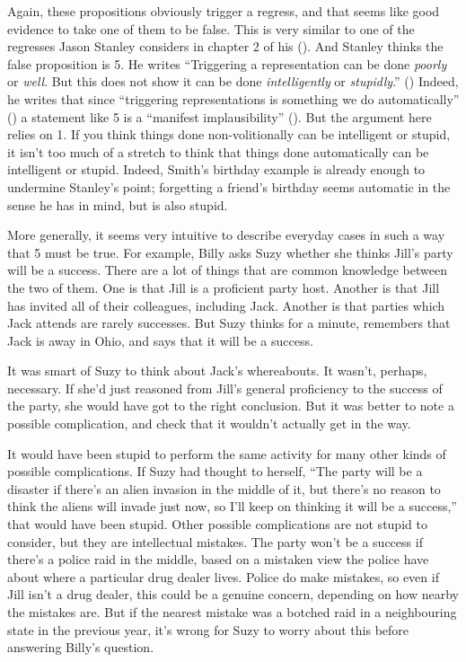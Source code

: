 \documentclass[
  10pt,
  letterpaper,
  DIV=11,
  numbers=noendperiod,
  twoside]{scrartcl}
\begin{document}
Again, these propositions obviously trigger a regress, and that seems
like good evidence to take one of them to be false. This is very similar
to one of the regresses Jason Stanley considers in chapter 2 of his
(). And Stanley thinks the false
proposition is 5. He writes ``Triggering a representation can be done
\emph{poorly} or \emph{well}. But this does not show it can be done
\emph{intelligently} or \emph{stupidly}.''
() Indeed, he writes that
since ``triggering representations is something we do automatically''
() a statement like 5 is a
``manifest implausibility'' (). But the argument here relies on 1. If you think things done
non-volitionally can be intelligent or stupid, it isn't too much of a
stretch to think that things done automatically can be intelligent or
stupid. Indeed, Smith's birthday example is already enough to undermine
Stanley's point; forgetting a friend's birthday seems automatic in the
sense he has in mind, but is also stupid.

More generally, it seems very intuitive to describe everyday cases in
such a way that 5 must be true. For example, Billy asks Suzy whether she
thinks Jill's party will be a success. There are a lot of things that
are common knowledge between the two of them. One is that Jill is a
proficient party host. Another is that Jill has invited all of their
colleagues, including Jack. Another is that parties which Jack attends
are rarely successes. But Suzy thinks for a minute, remembers that Jack
is away in Ohio, and says that it will be a success.

It was smart of Suzy to think about Jack's whereabouts. It wasn't,
perhaps, necessary. If she'd just reasoned from Jill's general
proficiency to the success of the party, she would have got to the right
conclusion. But it was better to note a possible complication, and check
that it wouldn't actually get in the way.

It would have been stupid to perform the same activity for many other
kinds of possible complications. If Suzy had thought to herself, ``The
party will be a disaster if there's an alien invasion in the middle of
it, but there's no reason to think the aliens will invade just now, so
I'll keep on thinking it will be a success,'' that would have been
stupid. Other possible complications are not stupid to consider, but
they are intellectual mistakes. The party won't be a success if there's
a police raid in the middle, based on a mistaken view the police have
about where a particular drug dealer lives. Police do make mistakes, so
even if Jill isn't a drug dealer, this could be a genuine concern,
depending on how nearby the mistakes are. But if the nearest mistake was
a botched raid in a neighbouring state in the previous year, it's wrong
for Suzy to worry about this before answering Billy's question.
\end{document}
